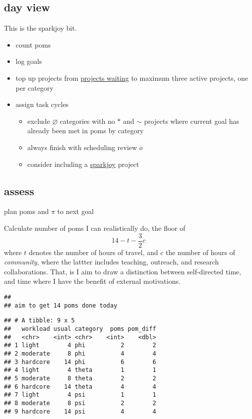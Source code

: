 \documentclass[]{book}
\providecommand{\tightlist}{%
  \setlength{\itemsep}{0pt}\setlength{\parskip}{0pt}}
\begin{document}
\hypertarget{day-view-1}{%
\subsection{day view}\label{day-view-1}}

This is the sparkjoy bit.

\begin{itemize}
\tightlist
\item
  count poms
\item
  log goals
\item
  top up projects from \protect\hyperlink{projects-waiting}{projects waiting} to maximum three active projects, one per category
\item
  assign task cycles

  \begin{itemize}
  \tightlist
  \item
    exclude \(\varnothing\) categories with no \(*\) and \(\sim\) projects where current goal has already been met in poms by category
  \item
    always finish with scheduling review \(\overline o\)
  \item
    consider including a \href{https://en.wikipedia.org/wiki/Marie_Kondo}{sparkjoy} project
  \end{itemize}
\end{itemize}

\hypertarget{assess}{%
\subsection{assess}\label{assess}}

plan poms and \(\pi\) to next goal

Calculate number of poms I can realistically do, the floor of
\[
14 - t - \frac 3 2 c
\]
where \(t\) denotes the number of hours of travel, and \(c\) the number of hours of \emph{community}, where the lattter includes teaching, outreach, and research collaborations. That, is I aim to draw a distinction between self-directed time, and time where I have the benefit of external motivations.

\begin{verbatim}
## 
## aim to get 14 poms done today
\end{verbatim}

\begin{verbatim}
## # A tibble: 9 x 5
##   workload usual category  poms pom_diff
##   <chr>    <int> <chr>    <int>    <dbl>
## 1 light        4 phi          2        2
## 2 moderate     8 phi          4        4
## 3 hardcore    14 phi          6        6
## 4 light        4 theta        1        1
## 5 moderate     8 theta        2        2
## 6 hardcore    14 theta        4        4
## 7 light        4 psi          1        1
## 8 moderate     8 psi          2        2
## 9 hardcore    14 psi          4        4
\end{verbatim}
\end{document}
